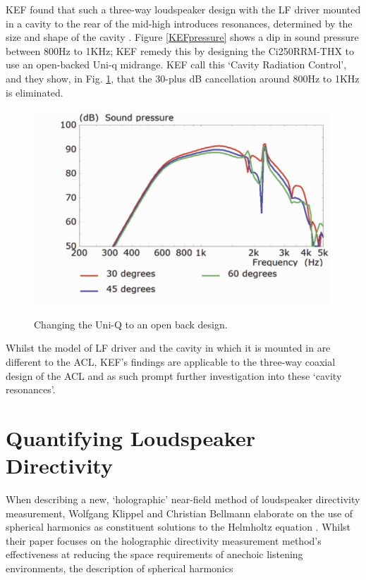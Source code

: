 \documentclass{report}
\begin{document}
        KEF found that such a three-way loudspeaker design with the LF driver mounted in a cavity to the rear of the mid-high introduces resonances, determined by the size and shape of the cavity \cite{KEFCi}.
        Figure \ref{KEFpressure} shows a dip in sound pressure between 800Hz to 1KHz; KEF remedy this by designing the Ci250RRM-THX to use an open-backed Uni-q midrange.
        KEF call this `Cavity Radiation Control', and they show, in Fig. \ref{KEFopenback}, that the 30-plus dB cancellation around 800Hz to 1KHz is eliminated.
        \begin{figure}[H]
            \centering
            \includegraphics[scale=0.5]{figs/KEFopenback.png}
            \caption{Changing the Uni-Q to an open back design.}\cite{KEFCi}
            \label{KEFopenback}
        \end{figure}
        Whilst the model of LF driver and the cavity in which it is mounted in are different to the ACL, KEF's findings are applicable to the three-way coaxial design of the ACL and as such prompt further investigation into these `cavity resonances'.

    \section{Quantifying Loudspeaker Directivity} 
        When describing a new, `holographic' near-field method of loudspeaker directivity measurement, Wolfgang Klippel and Christian Bellmann elaborate on the use of spherical harmonics as constituent solutions to the Helmholtz equation \cite{klippel2016holographic}.
        Whilst their paper focuses on the holographic directivity measurement method's effectiveness at reducing the space requirements of anechoic listening environments, the description of spherical harmonics
        
\end{document}
